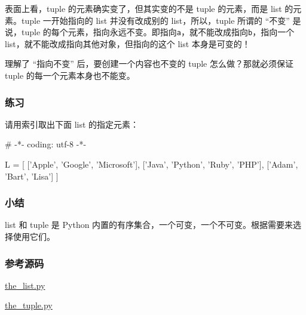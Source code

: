 表面上看，tuple 的元素确实变了，但其实变的不是 tuple 的元素，而是 list
的元素。tuple 一开始指向的 list 并没有改成别的 list，所以，tuple 所谓的
``不变'' 是说，tuple
的每个元素，指向永远不变。即指向\texttt{\textquotesingle{}a\textquotesingle{}}，就不能改成指向\texttt{\textquotesingle{}b\textquotesingle{}}，指向一个
list，就不能改成指向其他对象，但指向的这个 list 本身是可变的！

理解了 ``指向不变'' 后，要创建一个内容也不变的 tuple
怎么做？那就必须保证 tuple 的每一个元素本身也不能变。

\hypertarget{ux7ec3ux4e60}{%
\subsubsection{练习}\label{ux7ec3ux4e60}}

请用索引取出下面 list 的指定元素：

\begin{pythoncode}
# -*- coding: utf-8 -*-

L = [
    ['Apple', 'Google', 'Microsoft'],
    ['Java', 'Python', 'Ruby', 'PHP'],
    ['Adam', 'Bart', 'Lisa']
]
\end{pythoncode}

\hypertarget{ux5c0fux7ed3}{%
\subsubsection{小结}\label{ux5c0fux7ed3}}

list 和 tuple 是 Python
内置的有序集合，一个可变，一个不可变。根据需要来选择使用它们。

\hypertarget{ux53c2ux8003ux6e90ux7801}{%
\subsubsection{参考源码}\label{ux53c2ux8003ux6e90ux7801}}

\href{https://github.com/michaelliao/learn-python3/blob/master/samples/basic/the_list.py}{the\_list.py}

\href{https://github.com/michaelliao/learn-python3/blob/master/samples/basic/the_tuple.py}{the\_tuple.py}

